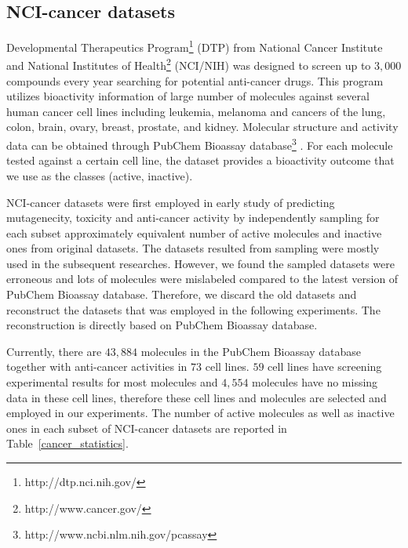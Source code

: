 \documentclass[english]{tktltiki}
\begin{document}
\subsection{NCI-cancer datasets}
\label{NCI_cancer_datasets}

Developmental Therapeutics Program\footnote{http://dtp.nci.nih.gov/} (DTP) from National Cancer Institute and National Institutes of Health\footnote{http://www.cancer.gov/} (NCI/NIH) was designed to screen up to \(3,000\) compounds every year searching for potential anti-cancer drugs. This program utilizes bioactivity information of large number of molecules against several human cancer cell lines including leukemia, melanoma and cancers of the lung, colon, brain, ovary, breast, prostate, and kidney. Molecular structure and activity data can be obtained through PubChem Bioassay database\footnote{http://www.ncbi.nlm.nih.gov/pcassay} \cite{wang09b}. For each molecule tested against a certain cell line, the dataset provides a bioactivity outcome that we use as the classes (active, inactive).

NCI-cancer datasets were first employed in early study \cite{swamidass05} of predicting mutagenecity, toxicity and anti-cancer activity by independently sampling for each subset approximately equivalent number of active molecules and inactive ones from original datasets. The datasets resulted from sampling were mostly used in the subsequent researches. However, we found the sampled datasets were erroneous and lots of molecules were mislabeled compared to the latest version of PubChem Bioassay database. Therefore, we discard the old datasets and reconstruct the datasets that was employed in the following experiments. The reconstruction is directly based on PubChem Bioassay database.

Currently, there are \(43,884\) molecules in the PubChem Bioassay database together with anti-cancer activities in \(73\) cell lines. \(59\) cell lines have screening experimental results for most molecules and $4,554$ molecules have no missing data in these cell lines, therefore these cell lines and molecules are selected and employed in our experiments. The number of active molecules as well as inactive ones in each subset of NCI-cancer datasets are reported in Table~\ref{cancer_statistics}.
\end{document}
